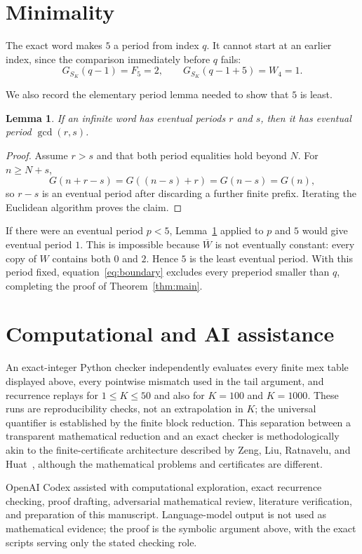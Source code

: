 \documentclass[11pt]{article}
\newtheorem{lemma}[theorem]{Lemma}
\begin{document}
\section{Minimality}

The exact word makes $5$ a period from index $q$.  It cannot start at
an earlier index, since the comparison immediately before $q$ fails:
\begin{equation}\label{eq:boundary}
 G_{S_K}(q-1)=F_5=2,\qquad
 G_{S_K}(q-1+5)=W_4=1.
\end{equation}

We also record the elementary period lemma needed to show that $5$ is
least.

\begin{lemma}\label{lem:gcd}
If an infinite word has eventual periods $r$ and $s$, then it has
eventual period $\gcd(r,s)$.
\end{lemma}

\begin{proof}
Assume $r>s$ and that both period equalities hold beyond $N$.  For
$n\geq N+s$,
\[
 G(n+r-s)=G((n-s)+r)=G(n-s)=G(n),
\]
so $r-s$ is an eventual period after discarding a further finite
prefix.  Iterating the Euclidean algorithm proves the claim.
\end{proof}

If there were an eventual period $p<5$, Lemma~\ref{lem:gcd} applied to
$p$ and $5$ would give eventual period $1$.  This is impossible because
$\overline W$ is not eventually constant: every copy of $W$ contains
both $0$ and $2$.  Hence $5$ is the least eventual period.  With this
period fixed, equation~\eqref{eq:boundary} excludes every preperiod
smaller than $q$, completing the proof of Theorem~\ref{thm:main}.

\section*{Computational and AI assistance}

An exact-integer Python checker independently evaluates every finite
mex table displayed above, every pointwise mismatch used in the tail
argument, and recurrence replays for $1\leq K\leq50$ and also for
$K=100$ and $K=1000$.  These runs are reproducibility checks, not
an extrapolation in $K$; the universal quantifier is established by the
finite block reduction.  This separation between a transparent
mathematical reduction and an exact checker is methodologically akin to
the finite-certificate architecture described by Zeng, Liu, Ratnavelu,
and Huat~\cite{ZengEtAl2026Certificates}, although the mathematical
problems and certificates are different.

OpenAI Codex assisted with computational exploration, exact recurrence
checking, proof drafting, adversarial mathematical review, literature
verification, and preparation of this manuscript.  Language-model
output is not used as mathematical evidence; the proof is the symbolic
argument above, with the exact scripts serving only the stated checking
role.



\end{document}
